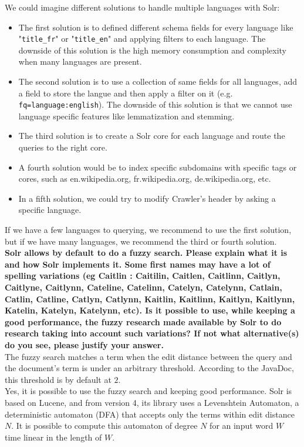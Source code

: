 \documentclass[a4paper]{article}
\begin{document}
We could imagine different solutions to handle multiple languages with Solr:
\begin{itemize}  
    \item The first solution is to defined different schema fields for every language like "\texttt{title\_fr}" or "\texttt{title\_en}" and applying filters to each language. The downside of this solution is the high memory consumption and complexity when many languages are present.
    \item The second solution is to use a collection of same fields for all languages, add a field to store the langue and then apply a filter on it (e.g. \texttt{fq=language:english}). The downside of this solution is that we cannot use language specific features like lemmatization and stemming.
    \item The third solution is to create a Solr core for each language and route the queries to the right core.
    \item A fourth solution would be to index specific subdomains with specific tags or cores, such as en.wikipedia.org, fr.wikipedia.org, de.wikipedia.org, etc.
    \item In a fifth solution, we could try to modify Crawler's header by asking a specific language.
\end{itemize}
If we have a few languages to querying, we recommend to use the first solution, but if we have many languages, we recommend the third or fourth solution. \\

\textbf{Solr allows by default to do a fuzzy search. Please explain what it is and how Solr implements it. Some first names may have a lot of spelling variations (eg Caitlin : Caitilin, Caitlen, Caitlinn, Caitlyn, Caitlyne, Caitlynn, Cateline, Catelinn, Catelyn, Catelynn, Catlain, Catlin, Catline, Catlyn, Catlynn, Kaitlin, Kaitlinn, Kaitlyn, Kaitlynn, Katelin, Katelyn, Katelynn, etc). Is it possible to use, while keeping a good performance, the fuzzy research made available by Solr to do research taking into account such variations? If not what alternative(s) do you see, please justify your answer.} \\

The fuzzy search matches a term when the edit distance between the query and the document's term is under an arbitrary threshold. According to the JavaDoc, this threshold is by default at $2$. \\

Yes, it is possible to use the fuzzy search and keeping good performance. Solr is based on Lucene, and from version 4, its library uses a Levenshtein Automaton, a deterministic automaton (DFA) that accepts only the terms within edit distance $N$. It is possible to compute this automaton of degree $N$ for an input word $W$ time linear in the length of $W$. \\
\end{document}
